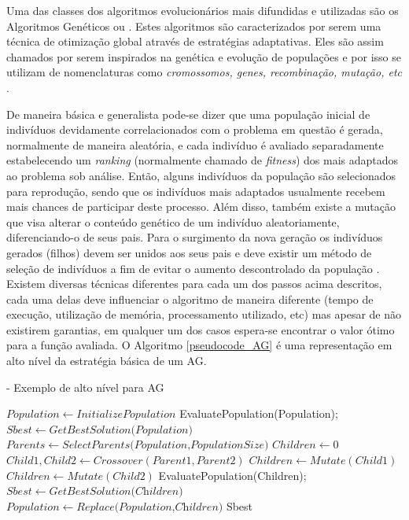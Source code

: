 Uma das classes dos algoritmos evolucionários mais difundidas e utilizadas são os Algoritmos Genéticos ou . Estes algoritmos são caracterizados por serem uma técnica de otimização global através de estratégias adaptativas. Eles são assim chamados por serem inspirados na genética e evolução de populações e por isso se utilizam de nomenclaturas como \emph{cromossomos, genes, recombinação, mutação, etc} \cite{Book-Brownlee2011}.

De maneira básica e generalista pode-se dizer que uma população inicial de indivíduos devidamente correlacionados com o problema em questão é gerada, normalmente de maneira aleatória, e cada indivíduo é avaliado separadamente estabelecendo um \emph{ranking} (normalmente chamado de \emph{fitness}) dos mais adaptados ao problema sob análise. Então, alguns indivíduos da população são selecionados para reprodução, sendo que os indivíduos mais adaptados usualmente recebem mais chances de participar deste processo. Além disso, também existe a mutação que visa alterar o conteúdo genético de um indivíduo aleatoriamente, diferenciando-o de seus pais. Para o surgimento da nova geração os indivíduos gerados (filhos) devem ser unidos aos seus pais e deve existir um método de seleção de indivíduos a fim de evitar o aumento descontrolado da população \cite{Book-Back2000}. Existem diversas técnicas diferentes para cada um dos passos acima descritos, cada uma delas deve influenciar o algoritmo de maneira diferente (tempo de execução, utilização de memória, processamento utilizado, etc) mas apesar de não existirem garantias, em qualquer um dos casos espera-se encontrar o valor ótimo para a função avaliada. O Algoritmo \ref{pseudocode_AG} é uma representação em alto nível da estratégia básica de um AG. 

\begin{algorithm} [h]
\caption{ - Exemplo de alto nível para AG}
\begin{algorithmic}[1]
\State $Population\gets \textit{InitializePopulation}$
\State EvaluatePopulation(Population);
\State $Sbest\gets \textit{GetBestSolution(Population)}$
\State $Parents\gets \textit{SelectParents(Population,PopulationSize)}$
\State $Children\gets 0$
\State $Child1, Child2 \gets Crossover(Parent1, Parent2)$
\State $Children \gets Mutate(Child1)$
\State $Children \gets Mutate(Child2)$
\EndFor
\State EvaluatePopulation(Children);
\State $Sbest\gets \textit{GetBestSolution(Children)}$
\State $Population\gets \textit{Replace(Population,Children)}$
\EndWhile
\State\Return Sbest
\end{algorithmic}
\label{pseudocode_AG}
\end{algorithm}



